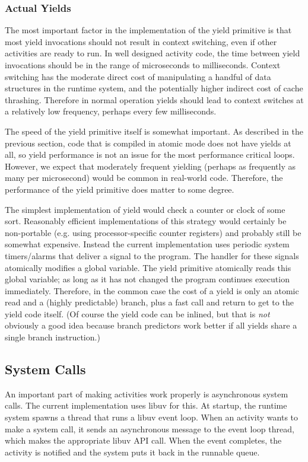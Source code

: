 \documentclass[sigplan,10pt,review,anonymous]{acmart}\settopmatter{printfolios=true,printccs=false,printacmref=false}
\begin{document}
\subsubsection{Actual Yields}

The most important factor in the implementation of the yield primitive is that most yield invocations should not result in context switching, even if other activities are ready to run.
In well designed activity code, the time between yield invocations should be in the range of microseconds to milliseconds.
Context switching has the moderate direct cost of manipulating a handful of data structures in the runtime system, and the potentially higher indirect cost of cache thrashing.
Therefore in normal operation yields should lead to context switches at a relatively low frequency, perhaps every few milliseconds.

The speed of the yield primitive itself is somewhat important.
As described in the previous section, code that is compiled in atomic mode does not have yields at all, so yield performance is not an issue for the most performance critical loops.
However, we expect that moderately frequent yielding (perhaps as frequently as many per microsecond) would be common in real-world code.
Therefore, the performance of the yield primitive does matter to some degree.

The simplest implementation of yield would check a counter or clock of some sort.
Reasonably efficient implementations of this strategy would certainly be non-portable (e.g. using processor-specific counter registers) and probably still be somewhat expensive.
Instead the current \charcoal{} implementation uses periodic system timers/alarms that deliver a signal to the program.
The handler for these signals atomically modifies a global variable.
The yield primitive atomically reads this global variable; as long as it has not changed the program continues execution immediately.
Therefore, in the common case the cost of a yield is only an atomic read and a (highly predictable) branch, plus a fast call and return to get to the yield code itself.
(Of course the yield code can be inlined, but that is \emph{not} obviously a good idea because branch predictors work better if all yields share a single branch instruction.)

\subsection{System Calls}

An important part of making activities work properly is asynchronous system calls.
The current \charcoal{} implementation uses libuv for this.
At startup, the runtime system spawns a thread that runs a libuv event loop.
When an activity wants to make a system call, it sends an asynchronous message to the event loop thread, which makes the appropriate libuv API call.
When the event completes, the activity is notified and the system puts it back in the runnable queue.
\end{document}
